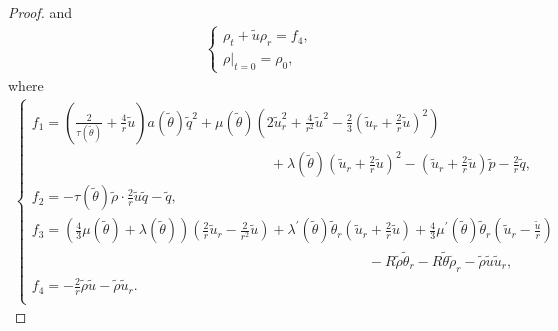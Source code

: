 \documentclass[11pt,reqno]{amsart}
\numberwithin{equation}{section}
\begin{document}
\begin{proof}
 and
 \begin{align}\label{loc3}
 \begin{cases}
  \rho_t+\tilde u \rho_r=f_4,\\
  \rho|_{t=0}=\rho_0,
  \end{cases}
  \end{align}
 where
 \begin{align*}
 \begin{cases}
 f_1=\left(\frac{2}{\tau(\tilde\theta)}+\frac{4}{r}\tilde u\right) a(\tilde\theta) \tilde q^2 + \mu(\tilde \theta)\left( 2\tilde u_r^2+\frac{4}{r^2}\tilde u^2 - \frac{2}{3} \left(\tilde u_r+\frac{2}{r} \tilde u\right)^2\right) \\
 \qquad\qquad\qquad\qquad\qquad\qquad\qquad\quad \qquad+ \lambda(\tilde \theta)\left(\tilde u_r+\frac{2}{r} \tilde u\right)^2-(\tilde u_r+\frac{2}{r} \tilde u) \tilde p-\frac{2}{r} \tilde q,\\
f_2=-\tau(\tilde \theta) \tilde \rho \cdot \frac{2}{r} \tilde u \tilde q-\tilde q, \\
f_3= \left(\frac{4}{3} \mu(\tilde \theta)+\lambda(\tilde \theta)\right)\left(\frac{2}{r}\tilde u_r-\frac{2}{r^2} \tilde u\right) + \lambda^\prime(\tilde \theta)\tilde \theta_r\left(\tilde u_r+\frac{2}{r}\tilde u\right) + \frac{4}{3}\mu^\prime(\tilde \theta)\tilde  \theta_r\left(\tilde u_r-\frac{\tilde u}{r}\right)\\
\qquad\qquad\qquad\qquad\qquad\qquad\qquad\qquad\qquad\qquad\qquad\qquad-R \tilde \rho \tilde \theta_r-R\tilde \theta \tilde \rho_r - \tilde \rho \tilde u  \tilde u_r,\\
f_4= -\frac{2}{r} \tilde \rho \tilde u-\tilde \rho \tilde u_r.\\
\end{cases}
 \end{align*}


\end{proof}
\end{document}
